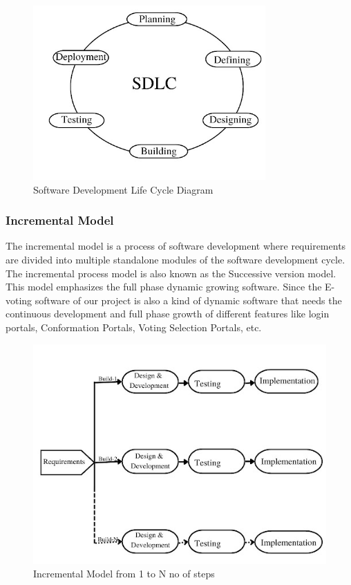 \begin{figure}[H] %
\begin{center}
	\includegraphics[width = 3.5in]{images/sdlc.jpg}
	\caption{Software Development Life Cycle Diagram} %
	\label{figSample1} %
\end{center}
\end{figure}

\subsubsection{Incremental Model}
The incremental model is a process of software development where requirements are divided into multiple standalone modules of the software development cycle. The incremental process model is also known as the Successive version model. This model emphasizes the full phase dynamic growing software. Since the E-voting software of our project is also a kind of dynamic software that needs the continuous development and full phase growth of different features like login portals, Conformation Portals, Voting Selection Portals, etc.

\begin{figure}[H] %
\begin{center}
	\includegraphics[width = 5in]{images/Incremental Model from 1 to N no of steps.jpg}
	\caption{Incremental Model from 1 to N no of steps} %
	\label{figSample1} %
\end{center}
\end{figure}

